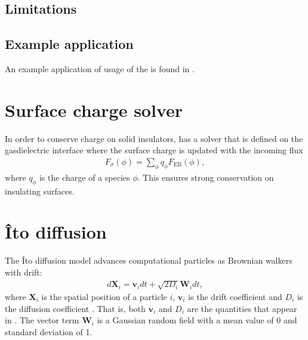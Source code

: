 \documentclass[letterpaper,10pt,english]{sphinxmanual}
\begin{document}
\subsection{Limitations}
\label{\detokenize{Solvers/RTE:limitations}}

\subsection{Example application}
\label{\detokenize{Solvers/RTE:example-application}}
An example application of usage of the  is found in {\hyperref[\detokenize{Applications/RadiativeTransferModel:chap-radiativetransfermodel}]{}}.


\section{Surface charge solver}
\label{\detokenize{Solvers/Sigma:surface-charge-solver}}\label{\detokenize{Solvers/Sigma:chap-sigmasolver}}\label{\detokenize{Solvers/Sigma::doc}}
In order to conserve charge on solid insulators,  has a solver that is defined on the gas\sphinxhyphen{}dielectric interface where the surface charge is updated with the incoming flux
\begin{equation*}
\begin{split}F_\sigma(\phi) = \sum_{\phi}q_\phi F_{\textrm{EB}}(\phi),\end{split}
\end{equation*}
where \(q_\phi\) is the charge of a species \(\phi\). This ensures strong conservation on insulating surfaces.


\section{Îto diffusion}
\label{\detokenize{Solvers/Ito:ito-diffusion}}\label{\detokenize{Solvers/Ito:chap-itodiffusion}}\label{\detokenize{Solvers/Ito::doc}}
The Îto diffusion model advances computational particles as Brownian walkers with drift:
\begin{equation*}
\begin{split}d\mathbf{X}_i = \mathbf{v}_idt + \sqrt{2D_i}\mathbf{W}_i dt,\end{split}
\end{equation*}
where \(\mathbf{X}_i\) is the spatial position of a particle \(i\), \(\mathbf{v}_i\) is the drift coefficient and \(D_i\) is the diffusion coefficient .
That is, both \(\mathbf{v}_i\) and \(D_i\) are the quantities that appear in {\hyperref[\detokenize{Solvers/CDR:chap-cdr}]{}}.
The vector term \(\mathbf{W}_i\) is a Gaussian random field with a mean value of 0 and standard deviation of 1.
\end{document}
